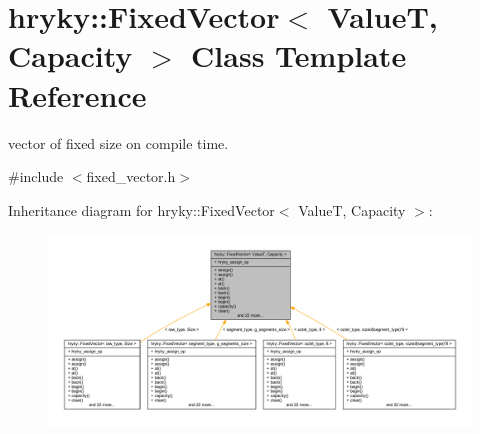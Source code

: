 \hypertarget{classhryky_1_1_fixed_vector}{\section{hryky\-:\-:Fixed\-Vector$<$ Value\-T, Capacity $>$ Class Template Reference}
\label{classhryky_1_1_fixed_vector}
}


vector of fixed size on compile time.  




{\ttfamily \#include $<$fixed\-\_\-vector.\-h$>$}



Inheritance diagram for hryky\-:\-:Fixed\-Vector$<$ Value\-T, Capacity $>$\-:
\nopagebreak
\begin{figure}[H]
\begin{center}
\leavevmode
\includegraphics[width=350pt]{classhryky_1_1_fixed_vector__inherit__graph}
\end{center}
\end{figure}

